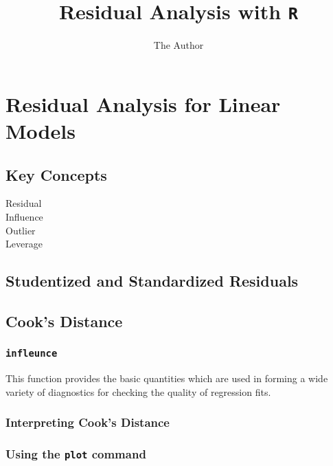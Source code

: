 \documentclass[11pt]{article} %
\title{Residual Analysis with \texttt{R}}
\author{The Author}
\begin{document}
\tableofcontents

\newpage
\section{Residual Analysis for Linear Models}

\subsection{Key Concepts}

\begin{description}
\item[Residual]

\item[Influence]

\item[Outlier]

\item[Leverage]

\end{description}

\subsection{Studentized and Standardized Residuals}
\newpage


\subsection{Cook's Distance}

\subsubsection{\texttt{infleunce}}
This function provides the basic quantities which are used in forming a wide variety of diagnostics for checking the quality of regression fits.



\subsubsection{Interpreting Cook's Distance}


\subsubsection{Using the \texttt{plot} command}
\end{document}
